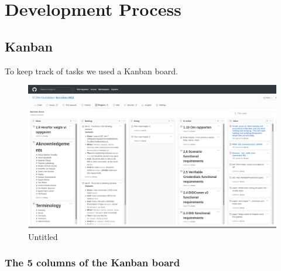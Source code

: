 \hypertarget{development-process}{%
\chapter{Development Process}\label{development-process}}

\hypertarget{kanban}{%
\section{Kanban}\label{kanban}}

To keep track of tasks we used a Kanban board.

\begin{figure}
\centering
\includegraphics{Development Process a132dd5987b94adf8fc5989add9afc3f/Untitled.png}
\caption{Untitled}
\end{figure}

\hypertarget{the-5-columns-of-the-kanban-board}{%
\subsection{The 5 columns of the Kanban
board}\label{the-5-columns-of-the-kanban-board}}

